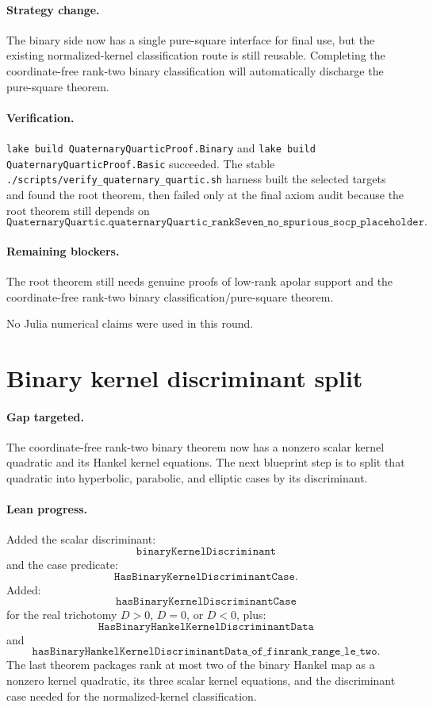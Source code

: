 \documentclass[11pt]{article}
\begin{document}
\paragraph{Strategy change.}
The binary side now has a single pure-square interface for final use, but the
existing normalized-kernel classification route is still reusable.  Completing
the coordinate-free rank-two binary classification will automatically discharge
the pure-square theorem.

\paragraph{Verification.}
\texttt{lake build QuaternaryQuarticProof.Binary} and
\texttt{lake build QuaternaryQuarticProof.Basic} succeeded.  The stable
\texttt{./scripts/verify\_quaternary\_quartic.sh} harness built the selected
targets and found the root theorem, then failed only at the final axiom audit
because the root theorem still depends on
\[
\texttt{QuaternaryQuartic.quaternaryQuartic\_rankSeven\_no\_spurious\_socp\_placeholder}.
\]

\paragraph{Remaining blockers.}
The root theorem still needs genuine proofs of low-rank apolar support and the
coordinate-free rank-two binary classification/pure-square theorem.

No Julia numerical claims were used in this round.

\section*{Binary kernel discriminant split}

\paragraph{Gap targeted.}
The coordinate-free rank-two binary theorem now has a nonzero scalar kernel
quadratic and its Hankel kernel equations.  The next blueprint step is to split
that quadratic into hyperbolic, parabolic, and elliptic cases by its
discriminant.

\paragraph{Lean progress.}
Added the scalar discriminant:
\[
\texttt{binaryKernelDiscriminant}
\]
and the case predicate:
\[
\texttt{HasBinaryKernelDiscriminantCase}.
\]
Added:
\[
\texttt{hasBinaryKernelDiscriminantCase}
\]
for the real trichotomy \(D>0\), \(D=0\), or \(D<0\), plus:
\[
\texttt{HasBinaryHankelKernelDiscriminantData}
\]
and
\[
\texttt{hasBinaryHankelKernelDiscriminantData\_of\_finrank\_range\_le\_two}.
\]
The last theorem packages rank at most two of the binary Hankel map as a
nonzero kernel quadratic, its three scalar kernel equations, and the
discriminant case needed for the normalized-kernel classification.
\end{document}
